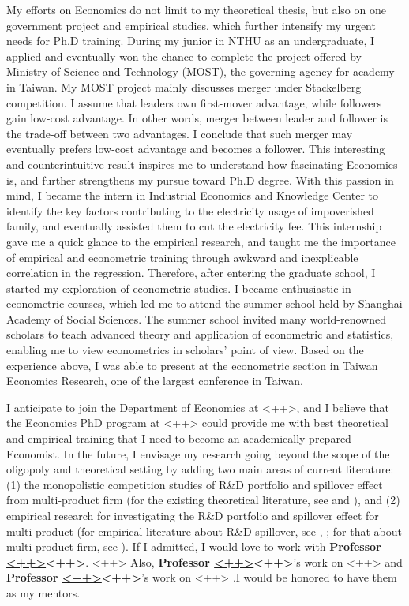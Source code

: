 \documentclass[12pt]{article}
\newcommand{\school}{<++>}
\newcommand{\profA}{\textbf{Professor \href{<++>}{<++>}<++>}}
\newcommand{\profB}{\textbf{Professor \href{<++>}{<++>}<++>}}
\newcommand{\profC}{\textbf{Professor \href{<++>}{<++>}<++>}}
\begin{document}
My efforts on Economics do not limit to my theoretical thesis, but also on one government project and empirical studies, which further intensify my urgent needs for Ph.D training.
During my junior in NTHU as an undergraduate, I applied and eventually won the chance to complete the project offered by Ministry of Science and Technology (MOST), the governing agency for academy in Taiwan.
My MOST project mainly discusses merger under Stackelberg competition.
I assume that leaders own first-mover advantage, while followers gain low-cost advantage.
In other words, merger between leader and follower is the trade-off between two advantages.
I conclude that such merger may eventually prefers low-cost advantage and becomes a follower.
This interesting and counterintuitive result inspires me to understand how fascinating Economics is, and further strengthens my pursue toward Ph.D degree.
With this passion in mind, I became the intern in Industrial Economics and Knowledge Center to identify the key factors contributing to the electricity usage of impoverished family, and eventually assisted them to cut the electricity fee.
This internship gave me a quick glance to the empirical research, and taught me the importance of empirical and econometric training through awkward and inexplicable correlation in the regression.
Therefore, after entering the graduate school, I started my exploration of econometric studies.
I became enthusiastic in econometric courses, which led me to attend the summer school held by Shanghai Academy of Social Sciences.
The summer school invited many world-renowned scholars to teach advanced theory and application of econometric and statistics, enabling me to view econometrics in scholars' point of view.
Based on the experience above, I was able to present at the econometric section in Taiwan Economics Research, one of the largest conference in Taiwan.

I anticipate to join the Department of Economics at \school{}, and I believe that the Economics PhD program at \school{} could provide me with best theoretical and empirical training that I need to become an academically prepared Economist.
In the future, I envisage my research going beyond the scope of the oligopoly and theoretical setting by adding two main areas of current literature: (1) the monopolistic competition studies of R\&D portfolio and spillover effect from multi-product firm (for the existing theoretical literature, see \textcite{feenstra_optimal_2007} and \textcite{ushchev_multi-product_2017}), and (2) empirical research for investigating the R\&D portfolio and spillover effect for multi-product (for empirical literature about R\&D spillover, see \textcite{bloom_identifying_2013}, \textcite{chin_patent_2006-1}; for that about multi-product firm, see \textcite{bernard_multiple-product_2010}).
If I admitted, I would love to work with \profA{}.
<++>
Also, \profB{}'s work on <++> and \profC{}'s work on <++> .I would be honored to have them as my mentors.
\end{document}
